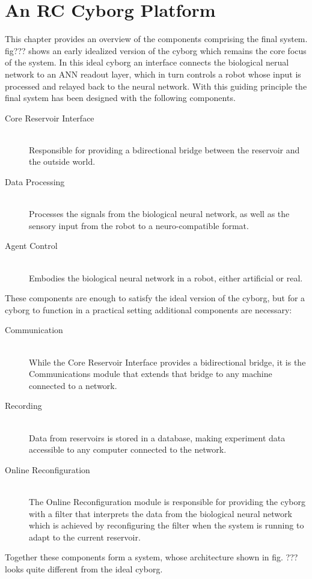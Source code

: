 \chapter{An RC Cyborg Platform}
This chapter provides an overview of the components comprising the final system.
fig??? shows an early idealized version of the cyborg which remains the core
focus of the system. In this ideal cyborg an interface connects the biological
nerual network to an ANN readout layer, which in turn controls a robot whose
input is processed and relayed back to the neural network. With this guiding
principle the final system has been designed with the following components.
\begin{description}
\item[Core Reservoir Interface]\mbox{}\\
  Responsible for providing a bdirectional bridge between the reservoir and the
  outside world.
\item[Data Processing]\mbox{}\\
  Processes the signals from the biological neural network, as well as the sensory
  input from the robot to a neuro-compatible format.
\item[Agent Control]\mbox{}\\
  Embodies the biological neural network in a robot, either artificial or real.
\end{description}
These components are enough to satisfy the ideal version of the cyborg, but for
a cyborg to function in a practical setting additional components are necessary: 
\begin{description}
\item[Communication]\mbox{}\\
  While the Core Reservoir Interface provides a bidirectional bridge, it is the
  Communications module that extends that bridge to any machine connected to a
  network.
\item[Recording]\mbox{}\\
  Data from reservoirs is stored in a database, making experiment data
  accessible to any computer connected to the network.
\item[Online Reconfiguration]\mbox{}\\
  The Online Reconfiguration module is responsible for providing the cyborg with
  a filter that interprets the data from the biological neural network which is
  achieved by reconfiguring the filter when the system is running to adapt to
  the current reservoir.
\end{description}
Together these components form a system, whose architecture shown in fig. ???
looks quite different from the ideal cyborg.

